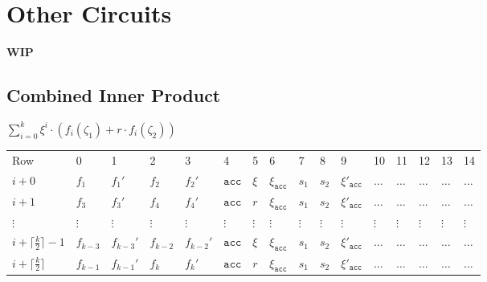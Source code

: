 \section{Other Circuits}
\label{section:other}
\textbf{WIP}

\subsection{Combined Inner Product}

$\sum\limits_{i = 0}^{k} \xi^i \cdot (f_i(\zeta_1) + r \cdot f_i(\zeta_2))$

\begin{center}
    \begin{table}[H]
        \begin{tabular}{llllllllllllllll}
            Row                                   & 0           & 1            & 2           & 3            & 4              & 5        & 6                    & 7        & 8        & 9                     & 10       & 11       & 12       & 13       & 14       \\
            $i + 0$                             & $f_1$       & $f_1'$       & $f_2$       & $f_2'$       & $\texttt{acc}$ & $\xi$    & $\xi_{\texttt{acc}}$ & $s_1$ & $s_2$ & $\xi'_{\texttt{acc}}$ & $\dots$ & $\dots$ & $\dots$ & $\dots$ & $\dots$ \\
            $i + 1$                             & $f_3$       & $f_3'$       & $f_4$       & $f_4'$       & $\texttt{acc}$ & $r$      & $\xi_{\texttt{acc}}$ & $s_1$ & $s_2$ & $\xi'_{\texttt{acc}}$ & $\dots$ & $\dots$ & $\dots$ & $\dots$ & $\dots$ \\
            $\vdots$                             & $\vdots$    & $\vdots$     & $\vdots$    & $\vdots$     & $\vdots$       & $\vdots$ & $\vdots$             & $\vdots$ & $\vdots$ & $\vdots$ & $\vdots$ & $\vdots$ & $\vdots$ & $\vdots$ & $\vdots$ \\
            $i + \lceil \frac{k}{2} \rceil - 1$ & $f_{k - 3}$ & $f_{k - 3}'$ & $f_{k - 2}$ & $f_{k - 2}'$ & $\texttt{acc}$ & $\xi$ & $\xi_{\texttt{acc}}$ & $s_1$ & $s_2$ & $\xi'_{\texttt{acc}}$ & $\dots$ & $\dots$ & $\dots$ & $\dots$ & $\dots$ \\
            $i + \lceil \frac{k}{2} \rceil$     & $f_{k - 1}$ & $f_{k - 1}'$ & $f_k$       & $f_k'$       & $\texttt{acc}$ & $r$ & $\xi_{\texttt{acc}}$ & $s_1$ & $s_2$ & $\xi'_{\texttt{acc}}$ & $\dots$ & $\dots$ & $\dots$ & $\dots$ & $\dots$ \\
        \end{tabular}
    \end{table}
\end{center}

